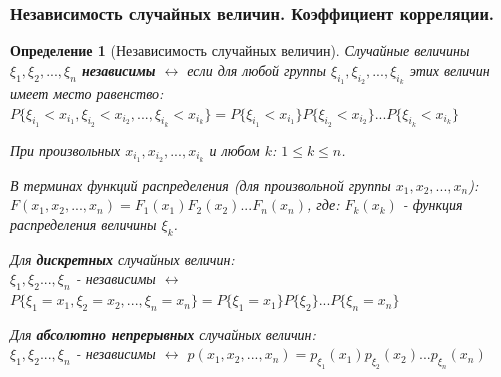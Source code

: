 \documentclass[14pt]{extarticle}
\theoremstyle{breakstyle}
\newtheorem{definition}{Определение}[subsection]
\begin{document}
\subsubsection{Независимость случайных величин. Коэффициент корреляции.}
\begin{definition}[Независимость случайных величин]

Случайные величины $\xi_{1}, \xi_{2}, ..., \xi_{n}$ \textbf{независимы} $\leftrightarrow$ если для любой группы $\xi_{i_{1}}, \xi_{i_{2}}, ..., \xi_{i_{k}}$ этих величин имеет место равенство:\\
$P\{\xi_{i_{1}} < x_{i_{1}}, \xi_{i_{2}} < x_{i_{2}}, ..., \xi_{i_{k}} < x_{i_{k}}\} = P\{\xi_{i_{1}} < x_{i_{1}}\}P\{\xi_{i_{2}} < x_{i_{2}}\}...P\{\xi_{i_{k}} < x_{i_{k}}\}$

\vspace{\baselineskip}

При произвольных $x_{i_{1}}, x_{i_{2}}, ..., x_{i_{k}}$ и любом $k$: $1 \leq k \leq n$.

\vspace{\baselineskip}

В терминах функций распределения (для произвольной группы $x_{1}, x_{2}, ..., x_{n}$):\\
$F(x_{1}, x_{2}, ..., x_{n}) = F_{1}(x_{1})F_{2}(x_{2})...F_{n}(x_{n})$, где: $F_{k}(x_{k})$ - функция распределения величины $\xi_{k}$.

\vspace{\baselineskip}

Для \textbf{дискретных} случайных величин:\\
$\xi_{1}, \xi_{2} ..., \xi_{n}$ - независимы $\leftrightarrow$ $P\{\xi_{1} = x_{1}, \xi_{2} = x_{2}, ..., \xi_{n} = x_{n}\} = P\{\xi_{1} = x_{1}\}P\{\xi_{2}\}...P\{\xi_{n} = x_{n}\}$

\vspace{\baselineskip}

Для \textbf{абсолютно непрерывных} случайных величин:\\
$\xi_{1}, \xi_{2} ..., \xi_{n}$ - независимы $\leftrightarrow$ $p(x_{1}, x_{2}, ..., x_{n}) = p_{\xi_{1}}(x_{1})p_{\xi_{2}}(x_{2})...p_{\xi_{n}}(x_{n})$

\end{definition}
\end{document}

